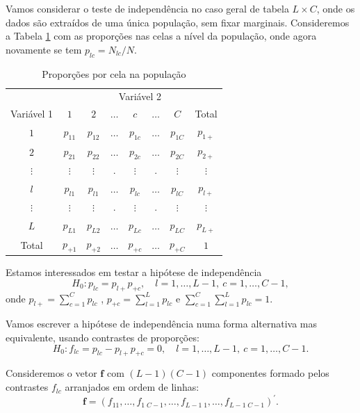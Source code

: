 \documentclass[]{book}
\numberwithin{example}{chapter}
\numberwithin{remark}{chapter}
\numberwithin{definition}{chapter}
\begin{document}
Vamos considerar o teste de independência no caso geral de tabela
\(L\times C\), onde os dados são extraídos de uma única população, sem
fixar marginais. Consideremos a Tabela \ref{tab83} com as proporções nas
celas a nível da população, onde agora novamente se tem
\(p_{lc}=N_{lc}/N\).

\begin{center}
\begin{table}[tbp] \centering
\caption{Proporções por cela na população}\bigskip \label{tab83}
\begin{tabular}{|c|cccccc|c|}
\hline\hline
& \multicolumn{7}{|c|}{Variável 2} \\ \cline{2-8}
Variável 1 & $1$ & $2$ & $\ldots $ & $c$ & $\ldots $ & $C$ & Total \\
\hline\hline
$1$ & $p_{11}$ & $p_{12}$ & $\ldots $ & $p_{1c}$ & $\ldots $ & $p_{1C}$ & $
p_{1+}$ \\
$2$ & $p_{21}$ & $p_{22}$ & $\ldots $ & $p_{2c}$ & $\ldots $ & $p_{2C}$ & $
p_{2+}$ \\
$\vdots $ & $\vdots $ & $\vdots $ & . & $\vdots $ & . & $\vdots $ & $\vdots $
\\
$l$ & $p_{l1}$ & $p_{l1}$ & $\ldots $ & $p_{lc}$ & $\ldots $ & $p_{lC}$ & $
p_{l+}$ \\
$\vdots $ & $\vdots $ & $\vdots $ & . & $\vdots $ & . & $\vdots $ & $\vdots $
\\
$L$ & $p_{L1}$ & $p_{L2}$ & $\ldots $ & $p_{Lc}$ & $\ldots $ & $p_{LC}$ & $
p_{L+}$ \\ \hline\hline
Total & $p_{+1}$ & $p_{+2}$ & $\ldots $ & $p_{+c}$ & $\ldots $ & $p_{+C}$ & $
1$ \\ \hline\hline
\end{tabular}
\end{table}
\end{center}

Estamos interessados em testar a hipótese de independência \[
H_{0}:p_{lc}=p_{l+}p_{+c},\quad l=1,\ldots ,L-1,\ c=1,\ldots,C-1, 
\] onde \(p_{l+}=\sum_{c=1}^{C}p_{lc}\) ,
\(p_{+c}=\sum_{l=1}^{L}p_{lc}\) e
\(\sum_{c=1}^{C}\sum_{l=1}^{L}p_{lc}=1\).

Vamos escrever a hipótese de independência numa forma alternativa mas
equivalente, usando contrastes de proporções: \[
H_{0}:f_{lc}=p_{lc}-p_{l+}p_{+c}=0,\quad l=1,\ldots ,L-1,\ c=1,\ldots
,C-1.
\]

Consideremos o vetor \(\mathbf{f}\) com
\(\left( L-1\right) \left( C-1\right)\) componentes formado pelos
contrastes \(f_{lc}\) arranjados em ordem de linhas: \[
\mathbf{f}=\left( f_{11},\ldots ,f_{1\;C-1},\ldots ,f_{L-1\;1},\ldots
,f_{L-1\;C-1}\right) ^{\prime }. 
\]
\end{document}
